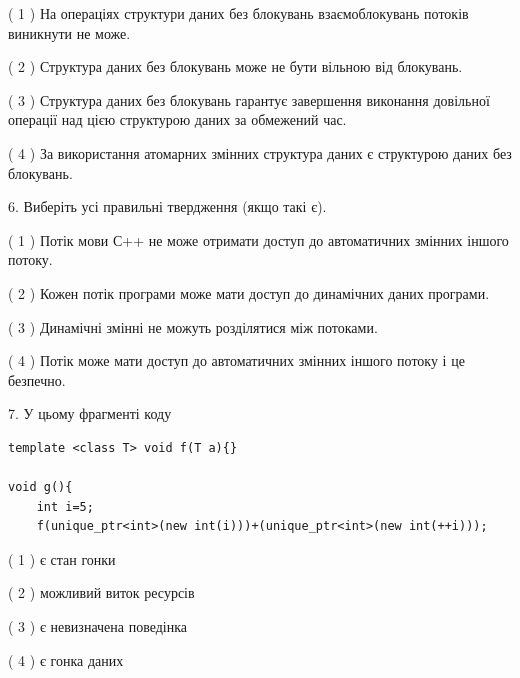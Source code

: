 \documentclass[12pt, ukrainian]{article}
\begin{document}
\begin {large}
{( 1 ) На операціях структури даних без блокувань взаємоблокувань потоків виникнути не може.%

( 2 ) Структура даних без блокувань може не бути вільною від блокувань.%

( 3 ) Структура даних без блокувань гарантує завершення виконання довільної операції над цією структурою даних за обмежений час.%

( 4 ) За використання атомарних змінних структура даних є структурою даних без блокувань.%
\newpage



\vspace{5mm}
6. Виберіть усі правильні твердження (якщо такі є).\par
\vspace{2mm}

( 1 ) Потік мови С++ не може отримати доступ до автоматичних змінних іншого потоку.%

( 2 ) Кожен потік програми може мати доступ до динамічних даних програми.%

( 3 ) Динамічні змінні не можуть розділятися між потоками.%

( 4 ) Потік може мати доступ до автоматичних змінних іншого потоку і це безпечно.%


\vspace{5mm}
7. У цьому фрагменті коду
\begin{verbatim}
template <class T> void f(T a){}

void g(){
    int i=5;
    f(unique_ptr<int>(new int(i)))+(unique_ptr<int>(new int(++i)));
\end{verbatim}
( 1 ) є стан гонки%

( 2 ) можливий виток ресурсів%

( 3 ) є невизначена поведінка%

( 4 ) є гонка даних%
}
\end {large}
\end{document}
